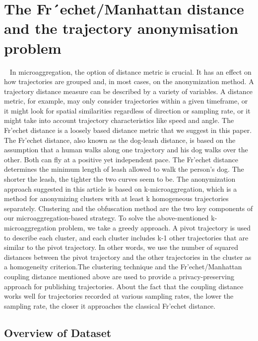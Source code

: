 \section{The Fr´{e}chet/Manhattan distance and the
trajectory anonymisation problem}~\label{sec:design}
In microaggregation, the option of distance metric is crucial. It has an effect on how trajectories are grouped and, in most cases, on the anonymization method. A trajectory distance measure can be described by a variety of variables. A distance metric, for example, may only consider trajectories within a given timeframe, or it might look for spatial similarities regardless of direction or sampling rate, or it might take into account trajectory characteristics like speed and angle. The Fr'{e}chet distance is a loosely based distance metric that we suggest in this paper. The Fr'{e}chet distance, also known as the dog-leash distance, is based on the assumption that a human walks along one trajectory and his dog walks over the other. Both can fly at a positive yet independent pace. The Fr'{e}chet distance determines the minimum length of leash allowed to walk the person's dog. The shorter the leash, the tighter the two curves seem to be. The anonymization approach suggested in this article is based on k-microaggregation, which is a method for anonymizing clusters with at least k homogeneous trajectories separately. Clustering and the obfuscation method are the two key components of our microaggregation-based strategy. To solve the above-mentioned k-microaggregation problem, we take a greedy approach. A pivot trajectory is used to describe each cluster, and each cluster includes k-1 other trajectories that are similar to the pivot trajectory. In other words, we use the number of squared distances between the pivot trajectory and the other trajectories in the cluster as a homogeneity criterion.The clustering technique and the Fr'{e}chet/Manhattan coupling distance mentioned above are used to provide a privacy-preserving approach for publishing trajectories. About the fact that the coupling distance works well for trajectories recorded at various sampling rates, the lower the sampling rate, the closer it approaches the classical Fr'{e}chet distance.

\subsection{Overview of Dataset}

